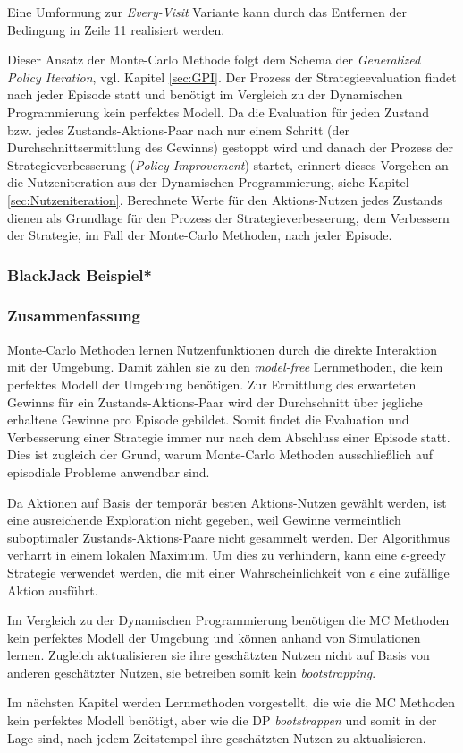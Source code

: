 Eine Umformung zur \textit{Every-Visit} Variante kann durch das Entfernen der Bedingung in Zeile 11 realisiert werden.
\par 
Dieser Ansatz der Monte-Carlo Methode folgt dem Schema der \textit{Generalized Policy Iteration}, vgl. Kapitel \ref{sec:GPI}. Der Prozess der Strategieevaluation findet nach jeder Episode statt und benötigt im Vergleich zu der Dynamischen Programmierung kein perfektes Modell. Da die Evaluation für jeden Zustand bzw. jedes Zustands-Aktions-Paar nach nur einem Schritt (der Durchschnittsermittlung des Gewinns) gestoppt wird und danach der Prozess der Strategieverbesserung (\textit{Policy Improvement}) startet, erinnert dieses Vorgehen an die Nutzeniteration aus der Dynamischen Programmierung, siehe Kapitel \ref{sec:Nutzeniteration}.  Berechnete Werte für den Aktions-Nutzen jedes Zustands dienen als Grundlage für den Prozess der Strategieverbesserung, dem Verbessern der Strategie, im Fall der Monte-Carlo Methoden, nach jeder Episode.
\subsubsection{BlackJack Beispiel*}

\subsubsection{Zusammenfassung}
Monte-Carlo Methoden lernen Nutzenfunktionen durch die direkte Interaktion mit der Umgebung. Damit zählen sie zu den \textit{model-free} Lernmethoden, die kein perfektes Modell der Umgebung benötigen. Zur Ermittlung des erwarteten Gewinns für ein Zustands-Aktions-Paar wird der Durchschnitt über jegliche erhaltene Gewinne pro Episode gebildet. Somit findet die Evaluation und Verbesserung einer Strategie immer nur nach dem Abschluss einer Episode statt. Dies ist zugleich der Grund, warum Monte-Carlo Methoden ausschließlich auf episodiale Probleme anwendbar sind.
\par 
Da Aktionen auf Basis der temporär besten Aktions-Nutzen gewählt werden, ist eine ausreichende Exploration nicht gegeben, weil Gewinne vermeintlich suboptimaler Zustands-Aktions-Paare nicht gesammelt werden. Der Algorithmus verharrt in einem lokalen Maximum. Um dies zu verhindern, kann eine $\epsilon$-greedy Strategie verwendet werden, die mit einer Wahrscheinlichkeit von $\epsilon$ eine zufällige Aktion ausführt.
\par 
Im Vergleich zu der Dynamischen Programmierung benötigen die MC Methoden kein perfektes Modell der Umgebung und können anhand von Simulationen lernen. Zugleich aktualisieren sie ihre geschätzten Nutzen nicht auf Basis von anderen geschätzter Nutzen, sie betreiben somit kein \textit{bootstrapping}. 
\par 
Im nächsten Kapitel werden Lernmethoden vorgestellt, die wie die MC Methoden kein perfektes Modell benötigt, aber wie die DP \textit{bootstrappen} und somit in der Lage sind, nach jedem Zeitstempel ihre geschätzten Nutzen zu aktualisieren.